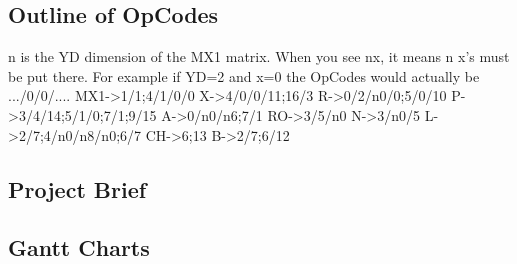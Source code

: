 \documentclass[12pt,a4paper]{article}
\begin{document}
\subsection{Outline of OpCodes}
n is the YD dimension of the MX1 matrix. When you see nx, it means n x's must be put there. For example if YD=2 and x=0 the OpCodes would actually be .../0/0/....
MX1->1/1;4/1/0/0
X->4/0/0/11;16/3
R->0/2/n0/0;5/0/10
P->3/4/14;5/1/0;7/1;9/15
A->0/n0/n6;7/1
RO->3/5/n0
N->3/n0/5
L->2/7;4/n0/n8/n0;6/7
CH->6;13
B->2/7;6/12
\subsection{Project Brief}
\subsection{Gantt Charts}
\end{document}
